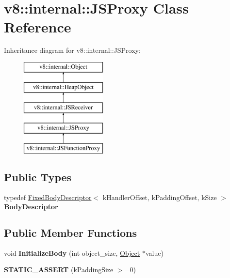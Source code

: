 \hypertarget{classv8_1_1internal_1_1_j_s_proxy}{}\section{v8\+:\+:internal\+:\+:J\+S\+Proxy Class Reference}
\label{classv8_1_1internal_1_1_j_s_proxy}
Inheritance diagram for v8\+:\+:internal\+:\+:J\+S\+Proxy\+:\begin{figure}[H]
\begin{center}
\leavevmode
\includegraphics[height=5.000000cm]{classv8_1_1internal_1_1_j_s_proxy}
\end{center}
\end{figure}
\subsection*{Public Types}
\begin{DoxyCompactItemize}
\item 
\hypertarget{classv8_1_1internal_1_1_j_s_proxy_a8cfabd65e923946f55cda0feb323c474}{}typedef \hyperlink{classv8_1_1internal_1_1_fixed_body_descriptor}{Fixed\+Body\+Descriptor}$<$ k\+Handler\+Offset, k\+Padding\+Offset, k\+Size $>$ {\bfseries Body\+Descriptor}\label{classv8_1_1internal_1_1_j_s_proxy_a8cfabd65e923946f55cda0feb323c474}

\end{DoxyCompactItemize}
\subsection*{Public Member Functions}
\begin{DoxyCompactItemize}
\item 
\hypertarget{classv8_1_1internal_1_1_j_s_proxy_ad51d4df406f0790313bc34b647b0b030}{}void {\bfseries Initialize\+Body} (int object\+\_\+size, \hyperlink{classv8_1_1internal_1_1_object}{Object} $\ast$value)\label{classv8_1_1internal_1_1_j_s_proxy_ad51d4df406f0790313bc34b647b0b030}

\item 
\hypertarget{classv8_1_1internal_1_1_j_s_proxy_a02f414198c815201b96a36df485f847b}{}{\bfseries S\+T\+A\+T\+I\+C\+\_\+\+A\+S\+S\+E\+R\+T} (k\+Padding\+Size $>$=0)\label{classv8_1_1internal_1_1_j_s_proxy_a02f414198c815201b96a36df485f847b}

\end{DoxyCompactItemize}
